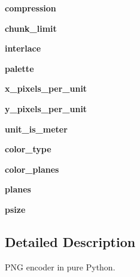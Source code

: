 \begin{DoxyCompactItemize}
{\bfseries compression}
\item 
\mbox{\label{classlib_1_1png_1_1_writer_a5ec4d05c22f709259a176e5977615dbb}} 
{\bfseries chunk\+\_\+limit}
\item 
\mbox{\label{classlib_1_1png_1_1_writer_a938a48375dbb2fb85f9a1854665418fb}} 
{\bfseries interlace}
\item 
\mbox{\label{classlib_1_1png_1_1_writer_a4f021fceb9d5e21324bd638c5b6baeff}} 
{\bfseries palette}
\item 
\mbox{\label{classlib_1_1png_1_1_writer_a179c0278272d345cc3b2a93519e6eaf2}} 
{\bfseries x\+\_\+pixels\+\_\+per\+\_\+unit}
\item 
\mbox{\label{classlib_1_1png_1_1_writer_a50abe214d55ba59a5752c615f9fd4efd}} 
{\bfseries y\+\_\+pixels\+\_\+per\+\_\+unit}
\item 
\mbox{\label{classlib_1_1png_1_1_writer_adf0eafd2e623d7b4e0ad67d3d9244ba2}} 
{\bfseries unit\+\_\+is\+\_\+meter}
\item 
\mbox{\label{classlib_1_1png_1_1_writer_a32574d987a976607e9a41dce02791565}} 
{\bfseries color\+\_\+type}
\item 
\mbox{\label{classlib_1_1png_1_1_writer_afefe7ea3d40841b196364517c36a2fc5}} 
{\bfseries color\+\_\+planes}
\item 
\mbox{\label{classlib_1_1png_1_1_writer_a0f524b0d030eb7e6f5d12ccb5e48bbad}} 
{\bfseries planes}
\item 
\mbox{\label{classlib_1_1png_1_1_writer_a4ebc750fbd0f380dbe628f8605223cae}} 
{\bfseries psize}
\end{DoxyCompactItemize}


\subsection{Detailed Description}
\begin{DoxyVerb}PNG encoder in pure Python.
\end{DoxyVerb}
 

